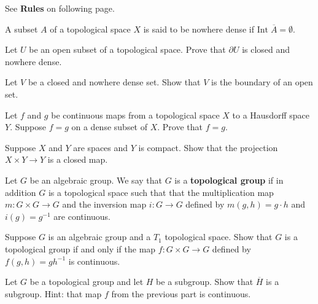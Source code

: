 \documentclass{homework651}
\def\ra{\rightarrow}
\def\Reals{\mathbb{R}}
\begin{document}
See \textbf{Rules} on following page.


\begin{problems}
\problem A subset $A$ of a topological space $X$ is said to be nowhere dense if $\mathrm{Int}\; \overline{A} = \emptyset$.
\begin{subproblems}
\item Let $U$ be an open subset of a topological space. Prove that $\partial U$ is closed and nowhere dense.
\item Let $V$ be a closed and nowhere dense set. Show that $V$ is the boundary of an open set.
\end{subproblems}


\problem Let $f$ and $g$ be continuous maps from a topological space $X$ to a Hausdorff
space $Y$.  Suppose $f=g$ on a dense subset of $X$. Prove that $f=g$. 


\problem Suppose $X$ and $Y$ are spaces and $Y$ is compact.
Show that the projection $X\times Y \to Y$ is a closed map.

\problem Let $G$ be an algebraic group.  We say that $G$ is a {\bf topological group}
if in addition $G$ is a topological space
such that that the multiplication
map $m:G\times G\ra G$ and the inversion map $i:G\ra G$ defined by $m(g,h)=g\cdot h$ and $i(g)=g^{-1}$
are continuous.
\begin{subproblems}
\item
Suppose $G$ is an algebraic group and a $T_1$ topological space.  Show that $G$ is a 
topological group if and only if the map $f:G\times G\ra G$ defined by $f(g,h)=g h^{-1}$
is continuous.
\item Let $G$ be a topological group and let $H$ be a subgroup.  Show that $\overline H$ is
a subgroup.  Hint: that map $f$ from the previous part is continuous. 
\end{subproblems}



\end{problems}
\end{document}
